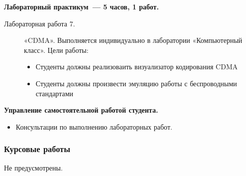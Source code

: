{\textbf{Лабораторный практикум~— 5 часов, 1 работ.}
\begin{description}
\item[Лабораторная работа 7.] «CDMA». Выполняется индивидуально в лаборатории «Компьютерный класс». Цели работы: \begin{itemize}
\item Студенты должны реализоваить визуализатор кодирования CDMA\item Студенты должны произвести эмуляцию работы с беспроводными стандартами
\end{itemize}
\end{description}

\textbf{Управление самостоятельной работой студента.}
\begin{itemize}
\item Консультации по выполнению лабораторных работ.
\end{itemize}
}



\subsubsection{Курсовые работы}
{\parindent0pt
Не предусмотрены.
}

